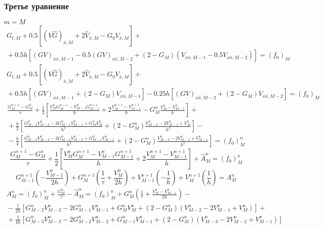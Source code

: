 \subsubsection{Третье уравнение}
$m = M$
\begin{multline*}
  G_{t,M} + 0.5 [(V \hat G)_{\bar x,M} + 2 \hat V_{\bar x,M} - G_0 V_{\bar x,M}]
  +{} \\ {}+
  0.5h [
    (GV)_{x \bar x, M-1} - 0.5(GV)_{x \bar x, M-2} +
    (2 - G_M) (V_{x \bar x, M-1} - 0.5V_{x \bar x, M-2}) ] = (f_0)_M
\end{multline*}
\begin{multline*}
  G_{t,M} + 0.5 [(V \hat G)_{\bar x,M} + 2 \hat V_{\bar x,M} - G_0 V_{\bar x,M}]
  +{} \\ {}+
  0.5h  [(GV)_{x \bar x, M-1} + (2 - G_M) V_{x \bar x, M-1}] -
  0.25h [(GV)_{x \bar x, M-2} + (2 - G_M) V_{x \bar x, M-2}]  = (f_0)_M
\end{multline*}
\begin{multline*}
  \frac{G_{M}^{n+1} - G_{M}^{n}}{\tau} 
  + \frac12 \left[
    \frac{V_{M}^{n} G_{M}^{n+1} - V_{M-1}^{n} G_{M-1}^{n+1}}{h} 
    + 2 \frac{V_{M}^{n+1} - V_{M-1}^{n+1}}{h} 
    - G_{M}^{n} \frac{V_{M}^{n} - V_{M-1}^{n}}{h} 
    \right] +{} \\ {}+
 \frac{h}{2} \left[
    \frac{G_{M-2}^{n} V_{M-2}^{n} - 2 G_{M-1}^{n} V_{M-1}^{n} + G_{M}^{n} V_{M}^{n}}{h^2} + 
    (2 - G_{M}^{n}) \frac{V_{M-2}^{n} - 2 V_{M-1}^{n} + V_{M}^{n}}{h^2}
    \right] -{} \\ {}-
 \frac{h}{4} \left[
    \frac{G_{M-3}^{n} V_{M-3}^{n} - 2 G_{M-2}^{n} V_{M-2}^{n} + G_{M-1}^{n} V_{M-1}^{n}}{h^2} + 
    (2 - G_{M}^{n}) \frac{V_{M-3}^{n} - 2 V_{M-2}^{n} + V_{M-1}^{n}}{h^2}
    \right] = (f_0)_{M}^{n}
\end{multline*}
\begin{equation*}
  \frac{G_{M}^{n+1} - G_{M}^{n}}{\tau} 
  + \frac12 \left[
    \frac{V_{M}^{n} G_{M}^{n+1} - V_{M-1}^{n} G_{M-1}^{n+1}}{h} 
    + 2 \frac{V_{M}^{n+1} - V_{M-1}^{n+1}}{h} \right] 
  + \hat A_{M}^{n} = (f_0)_{M}^{n}
\end{equation*}
\begin{equation*}
  G_{M-1}^{n+1} \left( - \frac{V_{M-1}^{n}}{2h} \right) +
  G_{M}^{n+1} \left( \frac{1}{\tau} + \frac{V_{M}^{n}}{2h} \right) +
  V_{M-1}^{n+1} \left(-\frac{1}{h} \right) +
  V_{M}^{n+1} \left( \frac{1}{h} \right) 
  = A_{M}^{n}
\end{equation*}
\begin{multline*}
  A_{M}^{n} = (f_0)_{M}^{n} + \frac{G_{M}^{n}}{\tau} -\hat A_{M}^{n} = 
  (f_0)_{M}^{n} + G_{M}^{n} \left( \frac{1}{\tau} + \frac{V_{M}^{n} - V_{M-1}^{n}}{2h} \right)
  -{} \\ {}-
  \frac{1}{2h} \left[
    G_{M-2}^{n} V_{M-2}^{n} - 2 G_{M-1}^{n} V_{M-1}^{n} + G_{M}^{n} V_{M}^{n} + 
    (2 - G_{M}^{n}) (V_{M-2}^{n} - 2 V_{M-1}^{n} + V_{M}^{n})
    \right] +{} \\ {}+
  \frac{1}{4h} \left[
    G_{M-3}^{n} V_{M-3}^{n} - 2 G_{M-2}^{n} V_{M-2}^{n} + G_{M-1}^{n} V_{M-1}^{n} + 
    (2 - G_{M}^{n}) (V_{M-3}^{n} - 2 V_{M-2}^{n} + V_{M-1}^{n})
    \right]
\end{multline*}


